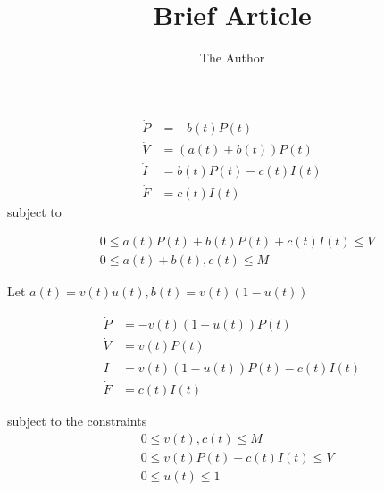\documentclass[12pt]{article} %
\title{Brief Article}
\author{The Author}
\begin{document}
\begin{equation}
\begin{aligned}
\dot{P} & = -b(t)P(t) \\
\dot{V} & = (a(t) + b(t))P(t) \\
\dot{I} & = b(t)P(t) - c(t)I(t)\\
\dot{F} & = c(t)I(t) 
\end{aligned}
\end{equation}
subject to 

\begin{equation}
\begin{aligned}
& 0 \le a(t)P(t) + b(t)P(t) + c(t)I(t) \le V \\
& 0 \le a(t)+b(t),c(t) \le M
\end{aligned}
\end{equation}

\bigskip 

Let $a(t) = v(t)u(t), b(t) = v(t)(1-u(t))$ 

\begin{equation}
\begin{aligned}
\dot{P} & = -v(t)(1-u(t))P(t) \\
\dot{V} & = v(t)P(t) \\
\dot{I} & = v(t)(1-u(t))P(t) - c(t)I(t)\\
\dot{F} & = c(t)I(t) 
\end{aligned}
\end{equation}

subject to the constraints 
\begin{equation}
\begin{aligned}
& 0 \le v(t), c(t) \le M \\
& 0 \le v(t)P(t) + c(t)I(t) \le V \\
& 0 \le u(t) \le 1
\end{aligned}
\end{equation}
\end{document}
